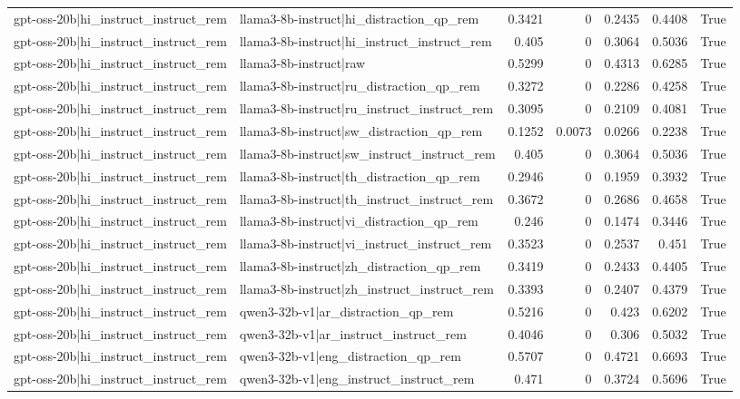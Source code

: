 \begin{table}
\begin{tabular}{l l r r r r l}
gpt-oss-20b|hi_instruct_instruct_rem & llama3-8b-instruct|hi_distraction_qp_rem & 0.3421 & 0 & 0.2435 & 0.4408 & True \\
gpt-oss-20b|hi_instruct_instruct_rem & llama3-8b-instruct|hi_instruct_instruct_rem & 0.405 & 0 & 0.3064 & 0.5036 & True \\
gpt-oss-20b|hi_instruct_instruct_rem & llama3-8b-instruct|raw & 0.5299 & 0 & 0.4313 & 0.6285 & True \\
gpt-oss-20b|hi_instruct_instruct_rem & llama3-8b-instruct|ru_distraction_qp_rem & 0.3272 & 0 & 0.2286 & 0.4258 & True \\
gpt-oss-20b|hi_instruct_instruct_rem & llama3-8b-instruct|ru_instruct_instruct_rem & 0.3095 & 0 & 0.2109 & 0.4081 & True \\
gpt-oss-20b|hi_instruct_instruct_rem & llama3-8b-instruct|sw_distraction_qp_rem & 0.1252 & 0.0073 & 0.0266 & 0.2238 & True \\
gpt-oss-20b|hi_instruct_instruct_rem & llama3-8b-instruct|sw_instruct_instruct_rem & 0.405 & 0 & 0.3064 & 0.5036 & True \\
gpt-oss-20b|hi_instruct_instruct_rem & llama3-8b-instruct|th_distraction_qp_rem & 0.2946 & 0 & 0.1959 & 0.3932 & True \\
gpt-oss-20b|hi_instruct_instruct_rem & llama3-8b-instruct|th_instruct_instruct_rem & 0.3672 & 0 & 0.2686 & 0.4658 & True \\
gpt-oss-20b|hi_instruct_instruct_rem & llama3-8b-instruct|vi_distraction_qp_rem & 0.246 & 0 & 0.1474 & 0.3446 & True \\
gpt-oss-20b|hi_instruct_instruct_rem & llama3-8b-instruct|vi_instruct_instruct_rem & 0.3523 & 0 & 0.2537 & 0.451 & True \\
gpt-oss-20b|hi_instruct_instruct_rem & llama3-8b-instruct|zh_distraction_qp_rem & 0.3419 & 0 & 0.2433 & 0.4405 & True \\
gpt-oss-20b|hi_instruct_instruct_rem & llama3-8b-instruct|zh_instruct_instruct_rem & 0.3393 & 0 & 0.2407 & 0.4379 & True \\
gpt-oss-20b|hi_instruct_instruct_rem & qwen3-32b-v1|ar_distraction_qp_rem & 0.5216 & 0 & 0.423 & 0.6202 & True \\
gpt-oss-20b|hi_instruct_instruct_rem & qwen3-32b-v1|ar_instruct_instruct_rem & 0.4046 & 0 & 0.306 & 0.5032 & True \\
gpt-oss-20b|hi_instruct_instruct_rem & qwen3-32b-v1|eng_distraction_qp_rem & 0.5707 & 0 & 0.4721 & 0.6693 & True \\
gpt-oss-20b|hi_instruct_instruct_rem & qwen3-32b-v1|eng_instruct_instruct_rem & 0.471 & 0 & 0.3724 & 0.5696 & True \\

\end{tabular}
\end{table}
